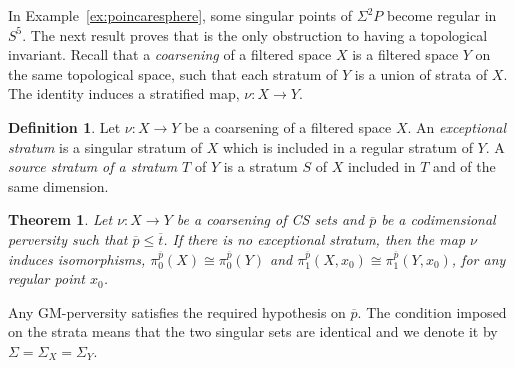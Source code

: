 \documentclass[a4paper,10pt,english,reqno]{amsart}
\theoremstyle{plain}
\newtheorem{theoremb}[proposition]{Theorem}
\theoremstyle{definition}
\newtheorem{definition}[proposition]{Definition}
\theoremstyle{remark}
\numberwithin{equation}{section}
\newcommand{\exemref}[1]{Example~\ref{#1}}
\def\ov{\overline}
\renewcommand\1{\hbox{\ding{192}}}
\renewcommand\2{\hbox{\ding{193}}}
\newcommand\3{\hbox{\ding{194}}}
\newcommand\4{\hbox{\ding{195}}}
\begin{document}

In \exemref{ex:poincaresphere}, some singular points of $\Sigma^2 P$  become regular in $S^5$. 
The next result proves that is the only obstruction to having a topological invariant.
Recall that a \emph{coarsening} of a filtered space $X$ is a filtered space $Y$ 
on the same topological space, such that each stratum of $Y$  
is a union of strata of $X$. The identity induces a stratified map, $\nu\colon X\to Y$.


\begin{definition}\label{def:source}
Let $\nu\colon X\to Y$ be a coarsening of a filtered space $X$. An \emph{exceptional stratum} is a singular stratum of $X$ which is included in a regular stratum of $Y$.
 A \emph{source stratum of a stratum $T$} of $Y$ is a stratum $S$ of $X$ included in  $T$ and of the same dimension.  
\end{definition}

\begin{theoremb}\label{thm:thepione}
Let $\nu\colon X\to Y$ be a coarsening of CS sets and
$\ov{p}$ be a codimensional perversity  such that $\ov{p}\leq \ov{t}$. 
If there is no exceptional stratum, then
% 
%
the map $\nu$ induces isomorphisms, 
$\pi_{0}^{\ov{p}}(X)\cong \pi_{0}^{\ov{p}}(Y)$ and
$\pi_{1}^{\ov{p}}(X,x_{0})\cong \pi_{1}^{\ov{p}}(Y,x_{0})$,
for any regular point $x_{0}$.
\end{theoremb}


Any GM-perversity satisfies the required hypothesis on $\ov{p}$.
The condition imposed on the strata means that the two singular sets are identical and we denote it by $\Sigma=\Sigma_{X}=\Sigma_{Y}$.
\end{document}
